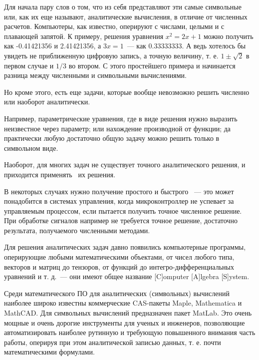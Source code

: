 
Для начала пару слов о том, что из себя представляют эти самые символьные или,
как их еще называют, аналитические вычисления, в отличие от численных расчетов.
Компьютеры, как известно, оперируют с числами, целыми и с плавающей
запятой.
К примеру, решения уравнения $x^{2} = 2x + 1$ можно получить как -0.41421356 и
2.41421356, а $3x = 1$\ --- как 0.33333333. А ведь хотелось бы увидеть не
приближенную цифровую запись, а точную величину, т. е. $1\pm\sqrt{2}$ в первом
случае и $1/3$ во втором. С этого простейшего примера и начинается разница между
численными и символьными вычислениями.

Но кроме этого, есть еще задачи, которые вообще невозможно решить численно или
наоборот аналитически.

Например, параметрические уравнения, где в виде решения нужно выразить
неизвестное через параметр; или нахождение производной от функции; да
практически любую достаточно общую задачу можно решить только в символьном виде.

Наоборот, для многих задач не существует точного аналитического решения, и
приходится применять \ их решения. 

В некоторых случаях нужно получение простого и быстрого \ --- это может понадобится в системах управления, когда микроконтроллер
не успевает за управляемым процессом, если пытается получить точное численное
решение. При обработке сигналов например не требуется точное решение, достаточно
результата, получаемого численными методами.

Для решения аналитических задач давно появились компьютерные программы,
оперирующие любыми математическими объектами, от чисел любого типа, векторов и
матриц до тензоров, от функций до интегро-дифференциальных уравнений и т. д.\
--- они имеют общее название [C]omputer [A]lgebra [S]ystem.

Среди математического ПО для аналитических (символьных) вычислений наиболее
широко известны коммерческие CAS-пакеты Maple, Mathematica и MathCAD.
Для символьных вычислений предназначен пакет MatLab.
Это очень мощные и очень дорогие инструменты для ученых и инженеров, позволяющие
автоматизировать наиболее рутинную и требующую повышенного внимания часть
работы, оперируя при этом аналитической записью данных, т. е. почти
математическими формулами.

